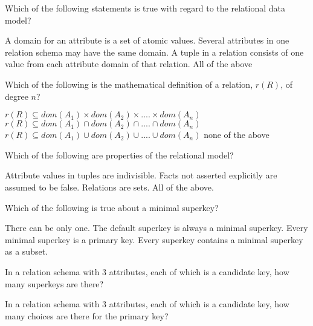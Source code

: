 \documentclass[answers,10pt,a4paper]{exam}
\begin{document}
\begin{questions}

\question[4] Which of the following statements is true with regard to the relational data model?

\begin{choices}
\choice A domain for an attribute is a set of atomic values.
\choice Several attributes in one relation schema may have the same domain.
\choice A tuple in a relation consists of one value from each attribute domain of that relation.
\correctchoice All of the above
\end{choices}

\question[4] Which of the following is the mathematical definition of a relation, $r(R)$, of degree $n$?

\begin{choices}
\correctchoice $r(R) \subseteq dom(A_1) \times dom(A_2) \times .... \times dom(A_n)$
\choice $r(R) \subseteq dom(A_1) \cap dom(A_2) \cap .... \cap dom(A_n)$
\choice $r(R) \subseteq dom(A_1) \cup dom(A_2) \cup .... \cup dom(A_n)$
\choice none of the above
\end{choices}

\question[4] Which of the following are properties of the relational model?

\begin{choices}
\choice Attribute values in tuples are indivisible.
\choice Facts not asserted explicitly are assumed to be false.
\choice Relations are sets.
\correctchoice All of the above.
\end{choices}

\question[4] Which of the following is true about a minimal superkey?

\begin{choices}
\choice There can be only one.
\choice The default superkey is always a minimal superkey.
\choice Every minimal superkey is a primary key.
\correctchoice Every superkey contains a minimal superkey as a subset.
\end{choices}

\question[4] In a relation schema with 3 attributes, each of which is a candidate key, how many superkeys are there?

\begin{choices}
\end{choices}

\question[4] In a relation schema with 3 attributes, each of which is a candidate key, how many choices are there for the primary key?


\end{questions}
\end{document}
